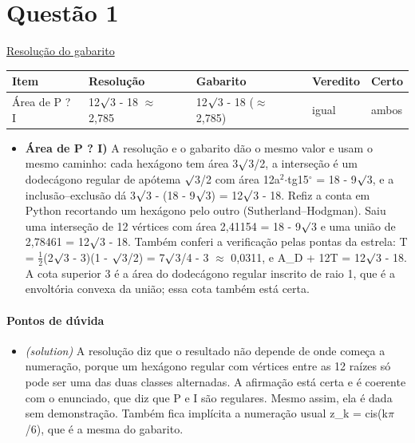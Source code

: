 \documentclass{article}%
\begin{document}
\section*{Questão 1}%
\href{https://poliedroresolve.sistemapoliedro.com.br/vestibulares/ime/2027/ime-2-fase-dia-1-26-10-2026-2-fase-dia-1/dissertativa-1-matematica-2-fase-dia-1-ime-2027}{Resolução do gabarito}\par\smallskip%
\begin{longtable}{@{}p{} p{} p{} p{} p{}@{}}\toprule Item & Resolução & Gabarito & Veredito & Certo \\ \midrule
Área de P ? I & 12$\surd$3 - 18 $\approx$ 2,785 & 12$\surd$3 - 18 ($\approx$ 2,785) & igual & ambos \\
\bottomrule\end{longtable}%
\begin{itemize}%
\item%
\textbf{Área de P ? I)} A resolução e o gabarito dão o mesmo valor e usam o mesmo caminho: cada hexágono tem área 3$\surd$3/2, a interseção é um dodecágono regular de apótema $\surd$3/2 com área 12a$^2$$\cdot$tg15$^\circ$ = 18 - 9$\surd$3, e a inclusão--exclusão dá 3$\surd$3 - (18 - 9$\surd$3) = 12$\surd$3 - 18. Refiz a conta em Python recortando um hexágono pelo outro (Sutherland--Hodgman). Saiu uma interseção de 12 vértices com área 2,41154 = 18 - 9$\surd$3 e uma união de 2,78461 = 12$\surd$3 - 18. Também conferi a verificação pelas pontas da estrela: T = $\frac12$(2$\surd$3 - 3)(1 - $\surd$3/2) = 7$\surd$3/4 - 3 $\approx$ 0,0311, e A\_D + 12T = 12$\surd$3 - 18. A cota superior 3 é a área do dodecágono regular inscrito de raio 1, que é a envoltória convexa da união; essa cota também está certa.%
\end{itemize}%
\paragraph{Pontos de dúvida}%
\begin{itemize}%
\item%
\textit{(solution)} A resolução diz que o resultado não depende de onde começa a numeração, porque um hexágono regular com vértices entre as 12 raízes só pode ser uma das duas classes alternadas. A afirmação está certa e é coerente com o enunciado, que diz que P e I são regulares. Mesmo assim, ela é dada sem demonstração. Também fica implícita a numeração usual z\_k = cis(k$\pi$/6), que é a mesma do gabarito.%
\end{itemize}%
\end{document}
